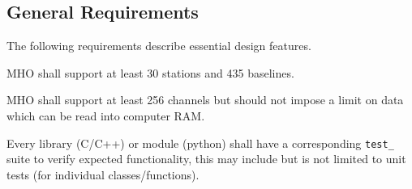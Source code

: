 

%
%




\subsection{General Requirements}
\label{sec:genreq}

The following requirements describe essential design features.

\begin{description}
 \ac{MHO} shall support at least 30 stations and 435 baselines.

 \ac{MHO} shall support at least 256 channels but should not impose a limit on
data which can be read into computer RAM.

 Every library (C/C++) or module (python) shall have a corresponding \texttt{test\_}
suite to verify expected functionality, this may include but is not limited to unit tests (for individual classes/functions).


\end{description}

